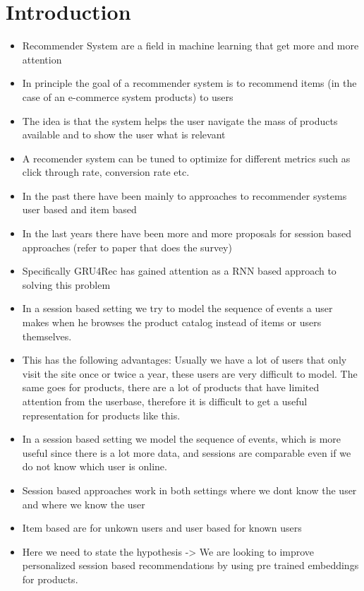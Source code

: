\chapter{Introduction}

\begin{itemize}
\item Recommender System are a field in machine learning that get more and more attention
\item In principle the goal of a recommender system is to recommend items (in the case of an e-commerce system products) to users
\item The idea is that the system helps the user navigate the mass of products available and to show the user what is relevant
\item A recomender system can be tuned to optimize for different metrics such as click through rate, conversion rate etc.
\item In the past there have been mainly to approaches to recommender systems user based and item based
\item In the last years there have been more and more proposals for session based approaches (refer to paper that does the survey)
\item Specifically GRU4Rec has gained attention as a RNN based approach to solving this problem
\item In a session based setting we try to model the sequence of events a user makes when he browses the product catalog instead of items or users themselves.
\item This has the following advantages: Usually we have a lot of users that only visit the site once or twice a year, these users are very difficult to model. The same goes for products, there are a lot of products that have limited attention from the userbase, therefore it is difficult to get a useful representation for products like this. 
\item In a session based setting we model the sequence of events, which is more useful since there is a lot more data, and sessions are comparable even if we do not know which user is online.
\item Session based approaches work in both settings where we dont know the user and where we know the user
\item Item based are for unkown users and user based for known users
\item Here we need to state the hypothesis -> We are looking to improve personalized session based recommendations by using pre trained embeddings for products.

\end{itemize}
